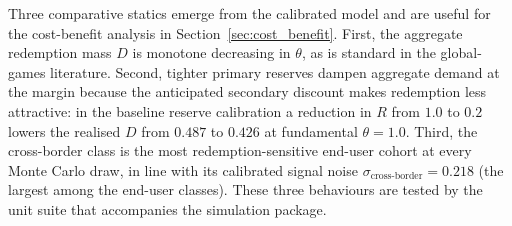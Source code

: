 Three comparative statics emerge from the calibrated model and are useful for the cost-benefit analysis in Section~\ref{sec:cost_benefit}. First, the aggregate redemption mass $D$ is monotone decreasing in $\theta$, as is standard in the global-games literature. Second, tighter primary reserves dampen aggregate demand at the margin because the anticipated secondary discount makes redemption less attractive: in the baseline reserve calibration a reduction in $R$ from $1.0$ to $0.2$ lowers the realised $D$ from $0.487$ to $0.426$ at fundamental $\theta = 1.0$. Third, the cross-border class is the most redemption-sensitive end-user cohort at every Monte Carlo draw, in line with its calibrated signal noise $\sigma_{\text{cross-border}} = 0.218$ (the largest among the end-user classes). These three behaviours are tested by the unit suite that accompanies the simulation package.
